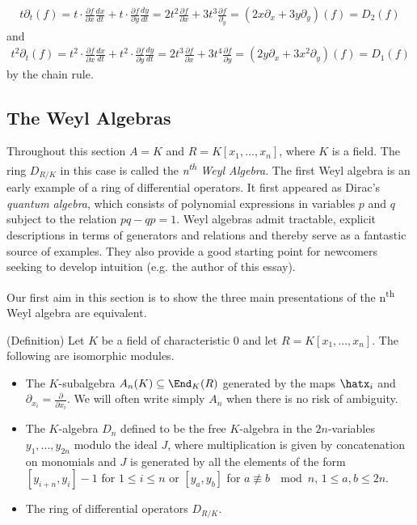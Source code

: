 \begin{example}
	\begin{align*}
		t\partial_t(f) = t\cdot \frac{\partial f}{\partial x} \frac{dx}{dt} + t\cdot \frac{\partial f}{\partial y} \frac{dy}{dt} = 2t^2\frac{\partial f}{\partial x} + 3t^3\frac{\partial f}{\partial_y} = (2x\partial_x + 3y\partial_y)(f) = D_2(f)
	\end{align*}
	and
	\begin{align*}
		t^2\partial_t(f) = t^2\cdot \frac{\partial f}{\partial x}\frac{dx}{dt} + t^2 \cdot \frac{\partial f}{\partial y}\frac{dy}{dt} = 2t^3\frac{\partial f}{\partial x} + 3t^4\frac{\partial f}{\partial y} = (2y\partial_x + 3x^2\partial_y)(f) = D_1(f)
	\end{align*}
	by the chain rule. 
\end{example}
\subsection{The Weyl Algebras}\label{sec:Weyl-algebra}

Throughout this section $A = K$ and $R = K[x_1,...,x_n]$, where $K$ is a field. The ring $D_{R/K}$ in this case is called the \emph{n\textsuperscript{th} Weyl Algebra}. The first Weyl algebra is an early example of a ring of differential operators. It first appeared as Dirac's \emph{quantum algebra}, which consists of polynomial expressions in variables $p$ and $q$ subject to the relation $pq - qp = 1$. Weyl algebras admit tractable, explicit descriptions in terms of generators and relations and thereby serve as a fantastic source of examples. They also provide a good starting point for newcomers seeking to develop intuition (e.g. the author of this essay).

Our first aim in this section is to show the three main presentations of the n\textsuperscript{th} Weyl algebra are equivalent.

\begin{thm}(Definition)\label{thm:Weyl-algebra-defs}
	Let $K$ be a field of characteristic $0$ and let $R = K[x_1,...,x_n]$. The following are isomorphic modules.
	\begin{itemize}
		\item The $K$-subalgebra $A_n(K) \subseteq \End_K(R)$ generated by the maps $\hatx_i$ and $\partial_{x_i} = \frac{\partial}{\partial x_i}$. We will often write simply $A_n$ when there is no risk of ambiguity.
		\item The $K$-algebra $D_n$ defined to be the free $K$-algebra in the $2n$-variables $y_1,...,y_{2n}$ modulo the ideal $J$, where multiplication is given by concatenation on monomials and $J$ is generated by all the elements of the form $[y_{i+n},y_{i}] - 1$ for $1\leq i\leq n$ or $[y_a,y_b]$ for $a \not\equiv b ~ \mod n$, $1\leq a,b\leq 2n$.
		\item The ring of differential operators $D_{R/K}$.
	\end{itemize}
\end{thm}

